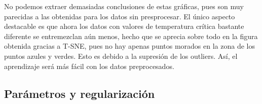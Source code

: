 \documentclass[a4]{article}
\begin{document}
\begin{figure}[H]
	\centering    
	\caption{}
	\label{fig:dimreduction-r2}
\end{figure}

No podemos extraer demasiadas conclusiones de estas gráficas, pues son muy parecidas a las obtenidas para los datos sin presprocesar. El único aspecto destacable es que ahora los datos con valores de temperatura crítica bastante diferente se entremezclan aún menos, hecho que se aprecia sobre todo en la figura obtenida gracias a T-SNE, pues no hay apenas puntos morados en la zona de los puntos azules y verdes. Esto es debido a la supresión de los outliers. Así, el aprendizaje será más fácil con los datos preprocesados. 

\subsection{Parámetros y regularización}
\end{document}

